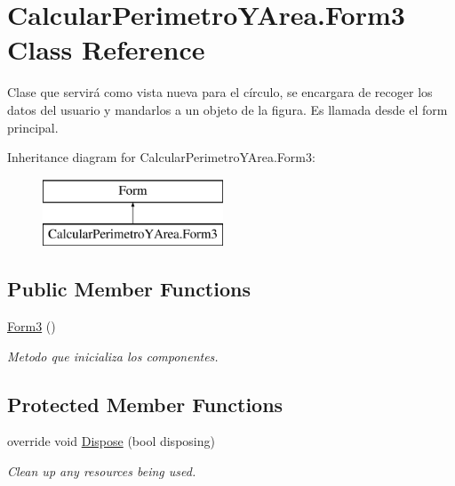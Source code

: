 \hypertarget{class_calcular_perimetro_y_area_1_1_form3}{}\section{Calcular\+Perimetro\+Y\+Area.\+Form3 Class Reference}
\label{class_calcular_perimetro_y_area_1_1_form3}


Clase que servirá como vista nueva para el círculo, se encargara de recoger los datos del usuario y mandarlos a un objeto de la figura. Es llamada desde el form principal.  


Inheritance diagram for Calcular\+Perimetro\+Y\+Area.\+Form3\+:\begin{figure}[H]
\begin{center}
\leavevmode
\includegraphics[height=2.000000cm]{class_calcular_perimetro_y_area_1_1_form3}
\end{center}
\end{figure}
\subsection*{Public Member Functions}
\begin{DoxyCompactItemize}
\item 
\hyperlink{class_calcular_perimetro_y_area_1_1_form3_a6ade964c5c2ed1690f66740e44a5b94c}{Form3} ()
\begin{DoxyCompactList}\small\item\em Metodo que inicializa los componentes. \end{DoxyCompactList}\end{DoxyCompactItemize}
\subsection*{Protected Member Functions}
\begin{DoxyCompactItemize}
\item 
override void \hyperlink{class_calcular_perimetro_y_area_1_1_form3_a5a1bbefcee0d410ef7fbceb0d976fa33}{Dispose} (bool disposing)
\begin{DoxyCompactList}\small\item\em Clean up any resources being used. \end{DoxyCompactList}\end{DoxyCompactItemize}


